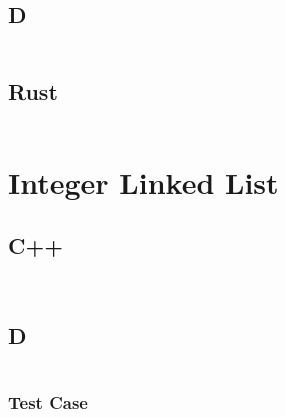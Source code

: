 \documentclass[finalcopy]{srpaper}
\begin{document}
\subsection{D}
\begin{mdframed}[linecolor=black]
\inputminted[fontsize=\scriptsize]{d}{../examples/sentence-splitter/sentence_splitter.d}
\end{mdframed}

\subsection{Rust}
\begin{mdframed}[linecolor=black]
\inputminted[fontsize=\scriptsize]{rust}{../examples/sentence-splitter/sentence_splitter.rs}
\end{mdframed}

\section{Integer Linked List}
\subsection{C++}
\begin{mdframed}[linecolor=black]
\inputminted[fontsize=\scriptsize]{cpp}{../examples/int-linked-list/int_linked_list.hpp}
\end{mdframed}

\begin{mdframed}[linecolor=black]
\inputminted[fontsize=\scriptsize]{cpp}{../examples/int-linked-list/int_linked_list.cpp}
\end{mdframed}

\subsection{D}
\begin{mdframed}[linecolor=black]
\inputminted[fontsize=\scriptsize]{d}{../examples/int-linked-list/int_linked_list.d}
\end{mdframed}

\subsubsection{Test Case}
\begin{mdframed}[linecolor=black]
\inputminted[fontsize=\scriptsize]{d}{../examples/int-linked-list/tests/int-linked-list-test.d}
\end{mdframed}
\end{document}
